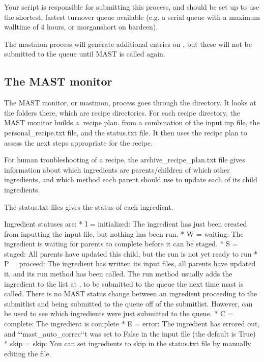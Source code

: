 \documentclass[letterpaper,10pt,english]{sphinxmanual}
\begin{document}
Your  script is responsible for submitting this process, and should be set up to use the shortest, fastest turnover queue available (e.g. a serial queue with a maximum walltime of 4 hours, or morganshort on bardeen).

The mastmon process will generate additional entries on , but these will not be submitted to the queue until MAST is called again.


\subsection{The MAST monitor}
\label{5_0_runningmast:the-mast-monitor}
The MAST monitor, or mastmon, process goes through the  directory. It looks at the folders there, which are recipe directories. For each recipe directory, the MAST monitor builds a .recipe plan. from a combination of the input.inp file, the personal\_recipe.txt file, and the status.txt file. It then uses the recipe plan to assess the next steps appropriate for the recipe.

For human troubleshooting of a recipe, the archive\_recipe\_plan.txt file gives information about which ingredients are parents/children of which other ingredients, and which method each parent should use to update each of its child ingredients.

The status.txt files gives the status of each ingredient.

Ingredient statuses are:
*  I = initialized: The ingredient has just been created from inputting the input file, but nothing has been run.
*  W = waiting: The ingredient is waiting for parents to complete before it can be staged.
*  S = staged: All parents have updated this child, but the run is not yet ready to run
*  P = proceed: The ingredient has written its input files, all parents have updated it, and its run method has been called. The run method usually adds the ingredient to the list at , to be submitted to the queue the next time mast is called. There is no MAST status change between an ingredient proceeding to the submitlist and being submitted to the queue off of the submitlist. However,  can be used to see which ingredients were just submitted to the queue.
*  C = complete: The ingredient is complete
*  E = error: The ingredient has errored out, and {\color{red}\bfseries{}{}`{}`}mast\_auto\_correc{}`{}`t was set to False in the input file (the default is True)
*  skip = skip: You can set ingredients to skip in the status.txt file by manually editing the file.
\end{document}
